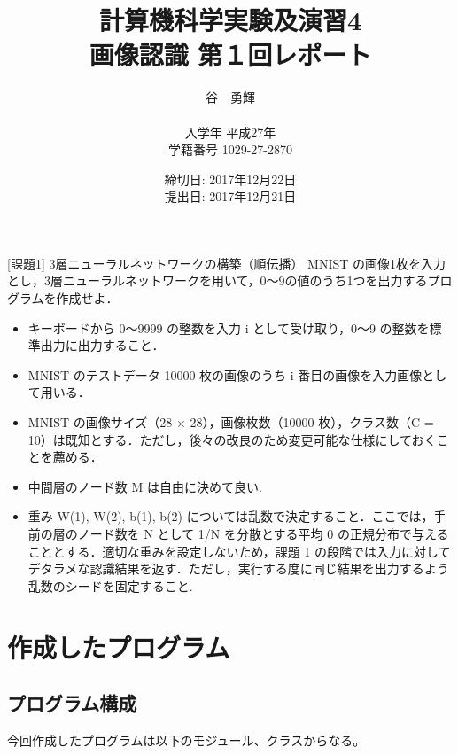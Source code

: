 \documentclass{ujarticle} %
\begin{document}
\title{計算機科学実験及演習4 \\ \bf 画像認識 第１回レポート}
\author{谷　勇輝 \\ \\入学年 平成27年 \\ 学籍番号 1029-27-2870}
\date{締切日: 2017年12月22日\\ 提出日: 2017年12月21日}
\maketitle
\newpage


\begin{itembox}[l]{[課題1] 3層ニューラルネットワークの構築（順伝播）}
  MNIST の画像1枚を入力とし，3層ニューラルネットワークを用いて，0～9の値のうち1つを出力するプログラムを作成せよ．
  \begin{itemize}
    \item キーボードから 0～9999 の整数を入力 i として受け取り，0～9 の整数を標準出力に出力すること．
    \item MNIST のテストデータ 10000 枚の画像のうち i 番目の画像を入力画像として用いる．
    \item MNIST の画像サイズ（28 × 28），画像枚数（10000 枚），クラス数（C = 10）は既知とする．ただし，後々の改良のため変更可能な仕様にしておくことを薦める．
    \item  中間層のノード数 M は自由に決めて良い.
    \item 重み W(1), W(2), b(1), b(2) については乱数で決定すること．ここでは，手前の層のノード数を N として 1/N を分散とする平均 0 の正規分布で与えることとする．適切な重みを設定しないため，課題 1 の段階では入力に対してデタラメな認識結果を返す．ただし，実行する度に同じ結果を出力するよう乱数のシードを固定すること.
  \end{itemize}
\end{itembox}

\section{作成したプログラム}
\subsection{プログラム構成}
今回作成したプログラムは以下のモジュール、クラスからなる。
\end{document}
